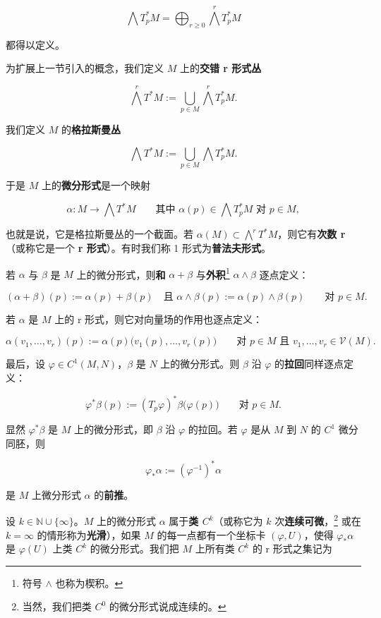 \[
\bigwedge T_{p}^{\ast}M = \bigoplus_{r\ge 0}\bigwedge^{r}T_{p}^{\ast}M
\]

都得以定义。

为扩展上一节引入的概念，我们定义 $ M $ 上的\textbf{交错 r 形式丛}

\[
\bigwedge^{r}T^{\ast}M := \bigcup_{p\in M}\bigwedge^{r}T_{p}^{\ast}M.
\]

我们定义 $ M $ 的\textbf{格拉斯曼丛}

\[
\bigwedge T^{\ast}M := \bigcup_{p\in M}\bigwedge T_{p}^{\ast}M.
\]

于是 $ M $ 上的\textbf{微分形式}是一个映射

\[
\alpha : M\to\bigwedge T^{\ast}M \qquad \text{其中 } \alpha(p)\in\bigwedge T_{p}^{\ast}M \text{ 对 } p\in M,
\]

也就是说，它是格拉斯曼丛的一个截面。若 $ \alpha(M)\subset\bigwedge^{r}T^{\ast}M $，则它有\textbf{次数 r}（或称它是一个 \textbf{r 形式}）。有时我们称 1 形式为\textbf{普法夫形式}。

若 $ \alpha $ 与 $ \beta $ 是 $ M $ 上的微分形式，则\textbf{和} $ \alpha+\beta $ 与\textbf{外积}\footnote{符号 $ \wedge $ 也称为楔积。} $ \alpha\wedge\beta $ 逐点定义：

\[
(\alpha+\beta)(p) := \alpha(p)+\beta(p) \quad \text{且 } \alpha\wedge\beta(p) := \alpha(p)\wedge\beta(p) \qquad \text{对 } p\in M.
\]

若 $ \alpha $ 是 $ M $ 上的 r 形式，则它对向量场的作用也逐点定义：

\[
\alpha(v_{1},\ldots,v_{r})(p) := \alpha(p)\big(v_{1}(p),\ldots,v_{r}(p)\big) \qquad \text{对 } p\in M \text{ 且 } v_{1},\ldots,v_{r}\in\mathcal{V}(M).
\]

最后，设 $ \varphi\in C^{1}(M,N) $，$ \beta $ 是 $ N $ 上的微分形式。则 $ \beta $ 沿 $ \varphi $ 的\textbf{拉回}同样逐点定义：

\[
\varphi^{\ast}\beta(p) := (T_{p}\varphi)^{\ast}\beta\big(\varphi(p)\big) \qquad \text{对 } p\in M.
\]

显然 $ \varphi^{\ast}\beta $ 是 $ M $ 上的微分形式，即 $ \beta $ 沿 $ \varphi $ 的拉回。若 $ \varphi $ 是从 $ M $ 到 $ N $ 的 $ C^{1} $ 微分同胚，则

\[
\varphi_{\ast}\alpha := (\varphi^{-1})^{\ast}\alpha
\]

是 $ M $ 上微分形式 $ \alpha $ 的\textbf{前推}。

设 $ k\in\mathbb{N}\cup\{\infty\} $。$ M $ 上的微分形式 $ \alpha $ 属于\textbf{类 $ C^{k} $}（或称它为 $ k $ 次\textbf{连续可微}，\footnote{当然，我们把类 $ C^{0} $ 的微分形式说成连续的。} 或在 $ k=\infty $ 的情形称为\textbf{光滑}），如果 $ M $ 的每一点都有一个坐标卡 $ (\varphi,U) $，使得 $ \varphi_{\ast}\alpha $ 是 $ \varphi(U) $ 上类 $ C^{k} $ 的微分形式。我们把 $ M $ 上所有类 $ C^{k} $ 的 r 形式之集记为

